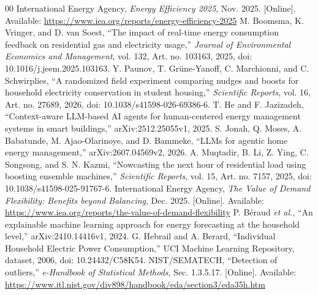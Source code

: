 \begin{thebibliography}{00}
 International Energy Agency, \emph{Energy Efficiency 2025}, Nov. 2025. [Online]. Available: \url{https://www.iea.org/reports/energy-efficiency-2025}
 M. Boomsma, K. Vringer, and D. van Soest, ``The impact of real-time energy consumption feedback on residential gas and electricity usage,'' \emph{Journal of Environmental Economics and Management}, vol. 132, Art. no. 103163, 2025, doi: 10.1016/j.jeem.2025.103163.
 Y. Paunov, T. Gr\"une-Yanoff, C. Marchionni, and C. Schwirplies, ``A randomized field experiment comparing nudges and boosts for household electricity conservation in student housing,'' \emph{Scientific Reports}, vol. 16, Art. no. 27689, 2026, doi: 10.1038/s41598-026-69386-6.
 T. He and F. Jazizadeh, ``Context-aware LLM-based AI agents for human-centered energy management systems in smart buildings,'' arXiv:2512.25055v1, 2025.
 S. Jonah, Q. Moses, A. Babatunde, M. Ajao-Olarinoye, and D. Bammeke, ``LLMs for agentic home energy management,'' arXiv:2607.04569v2, 2026.
 A. Muqtadir, B. Li, Z. Ying, C. Songsong, and S. N. Kazmi, ``Nowcasting the next hour of residential load using boosting ensemble machines,'' \emph{Scientific Reports}, vol. 15, Art. no. 7157, 2025, doi: 10.1038/s41598-025-91767-6.
 International Energy Agency, \emph{The Value of Demand Flexibility: Benefits beyond Balancing}, Dec. 2025. [Online]. Available: \url{https://www.iea.org/reports/the-value-of-demand-flexibility}
 P. B\'eraud \textit{et al.}, ``An explainable machine learning approach for energy forecasting at the household level,'' arXiv:2410.14416v1, 2024.
 G. Hebrail and A. Berard, ``Individual Household Electric Power Consumption,'' UCI Machine Learning Repository, dataset, 2006, doi: 10.24432/C58K54.
 NIST/SEMATECH, ``Detection of outliers,'' \emph{e-Handbook of Statistical Methods}, Sec. 1.3.5.17. [Online]. Available: \url{https://www.itl.nist.gov/div898/handbook/eda/section3/eda35h.htm}
\end{thebibliography}
